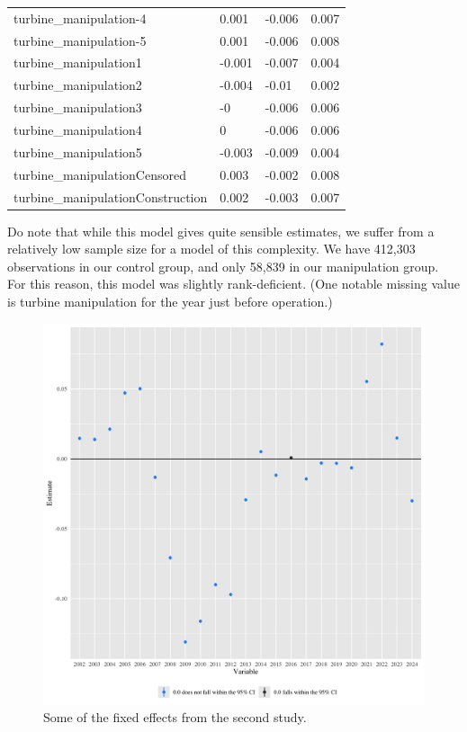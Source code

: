 \documentclass{article}
\begin{document}
\begin{table}[]
\begin{tabular}{llll}
turbine\_manipulation-4           & 0.001             & -0.006         & 0.007           \\
turbine\_manipulation-5           & 0.001             & -0.006         & 0.008           \\
turbine\_manipulation1            & -0.001            & -0.007         & 0.004           \\
turbine\_manipulation2            & -0.004            & -0.01          & 0.002           \\
turbine\_manipulation3            & -0                & -0.006         & 0.006           \\
turbine\_manipulation4            & 0                 & -0.006         & 0.006           \\
turbine\_manipulation5            & -0.003            & -0.009         & 0.004           \\
turbine\_manipulationCensored     & 0.003             & -0.002         & 0.008           \\
turbine\_manipulationConstruction & 0.002             & -0.003         & 0.007          
\end{tabular}
\end{table}

Do note that while this model gives quite sensible estimates, we suffer from a relatively low sample size for a model of this complexity.
We have 412,303 observations in our control group, and only 58,839 in our manipulation group.
For this reason, this model was slightly rank-deficient.
(One notable missing value is turbine manipulation for the year just before operation.)

\begin{figure}[h]
\centering
\includegraphics[width=0.9\linewidth]
{fixef_general.png} 
\caption{Some of the fixed effects from the second study.}
\label{fixef_general}
\end{figure}
\end{document}
